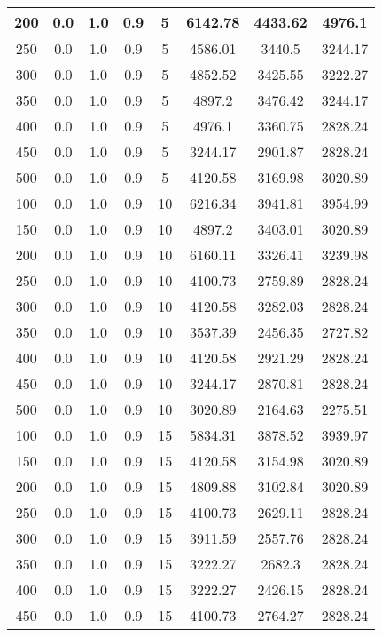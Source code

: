 \documentclass[a4paper, 12pt]{extreport}
\begin{document}
\begin{itemize}
\begin{longtable}{|c|c|c|c|c|c|c|c|}
			200 & 0.0 & 1.0 & 0.9 & 5 & 6142.78 & 4433.62 & 4976.1 \\\hline
			250 & 0.0 & 1.0 & 0.9 & 5 & 4586.01 & 3440.5 & 3244.17 \\\hline
			300 & 0.0 & 1.0 & 0.9 & 5 & 4852.52 & 3425.55 & 3222.27 \\\hline
			350 & 0.0 & 1.0 & 0.9 & 5 & 4897.2 & 3476.42 & 3244.17 \\\hline
			400 & 0.0 & 1.0 & 0.9 & 5 & 4976.1 & 3360.75 & 2828.24 \\\hline
			450 & 0.0 & 1.0 & 0.9 & 5 & 3244.17 & 2901.87 & 2828.24 \\\hline
			500 & 0.0 & 1.0 & 0.9 & 5 & 4120.58 & 3169.98 & 3020.89 \\\hline
			100 & 0.0 & 1.0 & 0.9 & 10 & 6216.34 & 3941.81 & 3954.99 \\\hline
			150 & 0.0 & 1.0 & 0.9 & 10 & 4897.2 & 3403.01 & 3020.89 \\\hline
			200 & 0.0 & 1.0 & 0.9 & 10 & 6160.11 & 3326.41 & 3239.98 \\\hline
			250 & 0.0 & 1.0 & 0.9 & 10 & 4100.73 & 2759.89 & 2828.24 \\\hline
			300 & 0.0 & 1.0 & 0.9 & 10 & 4120.58 & 3282.03 & 2828.24 \\\hline
			350 & 0.0 & 1.0 & 0.9 & 10 & 3537.39 & 2456.35 & 2727.82 \\\hline
			400 & 0.0 & 1.0 & 0.9 & 10 & 4120.58 & 2921.29 & 2828.24 \\\hline
			450 & 0.0 & 1.0 & 0.9 & 10 & 3244.17 & 2870.81 & 2828.24 \\\hline
			500 & 0.0 & 1.0 & 0.9 & 10 & 3020.89 & 2164.63 & 2275.51 \\\hline
			100 & 0.0 & 1.0 & 0.9 & 15 & 5834.31 & 3878.52 & 3939.97 \\\hline
			150 & 0.0 & 1.0 & 0.9 & 15 & 4120.58 & 3154.98 & 3020.89 \\\hline
			200 & 0.0 & 1.0 & 0.9 & 15 & 4809.88 & 3102.84 & 3020.89 \\\hline
			250 & 0.0 & 1.0 & 0.9 & 15 & 4100.73 & 2629.11 & 2828.24 \\\hline
			300 & 0.0 & 1.0 & 0.9 & 15 & 3911.59 & 2557.76 & 2828.24 \\\hline
			350 & 0.0 & 1.0 & 0.9 & 15 & 3222.27 & 2682.3 & 2828.24 \\\hline
			400 & 0.0 & 1.0 & 0.9 & 15 & 3222.27 & 2426.15 & 2828.24 \\\hline
			450 & 0.0 & 1.0 & 0.9 & 15 & 4100.73 & 2764.27 & 2828.24 \\\hline

\end{longtable}
\end{itemize}
\end{document}

